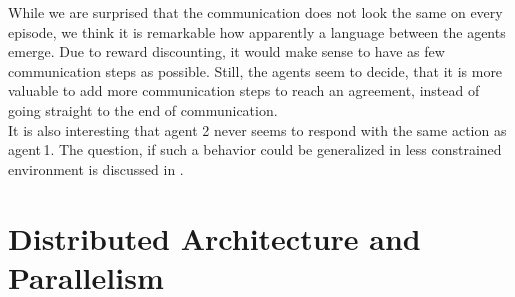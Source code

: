 While we are surprised that the communication does not look the same on every episode, we think it is remarkable how apparently a language between the agents emerge. Due to reward discounting, it would make sense to have as few communication steps as possible. Still, the agents seem to decide, that it is more valuable to add more communication steps to reach an agreement, instead of going straight to the end of communication.\\
It is also interesting that agent 2 never seems to respond with the same action as agent\,1. The question, if such a behavior could be generalized in less constrained environment is discussed in .
\newpage
\section{Distributed Architecture and Parallelism}\label{dist_architecture}

